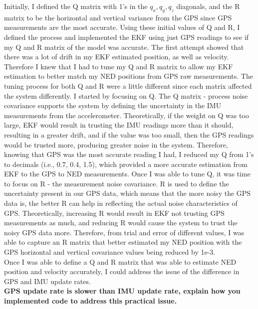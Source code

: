 Initially, I defined the Q matrix with 1's in the $q_x, q_y, q_z$ diagonals, and the R matrix to be the horizontal and vertical variance from the GPS since GPS measurements are the most accurate. Using these initial values of Q and R, I defined the process and implemented the EKF using just GPS readings to see if my Q and R matrix of the model was accurate. The first attempt showed that there was a lot of drift in my EKF estimated position, as well as velocity. Therefore I knew that I had to tune my Q and R matrix to allow my EKF estimation to better match my NED positions from GPS raw measurements. The tuning process for both Q and R were a little different since each matrix affected the system differently. I started by focusing on Q. The Q matrix - process noise covariance supports the system by defining the uncertainty in the IMU measurements from the accelerometer. Theoretically, if the weight on Q was too large, EKF would result in trusting the IMU readings more than it should, resulting in a greater drift, and if the value was too small, then the GPS readings would be trusted more, producing greater noise in the system. Therefore, knowing that GPS was the most accurate reading I had, I reduced my Q from 1's to decimals (i.e., 0.7, 0.4, 1.5), which provided a more accurate estimation from EKF to the GPS to NED measurements. Once I was able to tune Q, it was time to focus on R - the measurement noise covariance. R is used to define the uncertainty present in our GPS data, which means that the more noisy the GPS data is, the better R can help in reflecting the actual noise characteristics of GPS. Theoretically, increasing R would result in EKF not trusting GPS measurements as much, and reducing R would cause the system to trust the noisy GPS data more. Therefore, from trial and error of different values, I was able to capture an R matrix that better estimated my NED position with the GPS horizontal and vertical covariance values being reduced by 1e-3.\\

Once I was able to define a Q and R matrix that was able to estimate NED position and velocity accurately, I could address the issue of the difference in GPS and IMU update rates.\\

\textbf{GPS update rate is slower than IMU update rate, explain how you implemented code to address this practical issue.}\\

